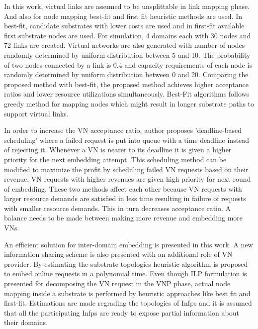 \documentclass[article,dr=phil,type=msc ,colorback,accentcolor=tud4b]{tudthesis}
\begin{document}
In this work, virtual links are assumed to be unsplittable in link mapping phase. And also for node mapping best-fit and first fit heuristic methods are used. In best-fit, candidate substrates with lower costs are used and in first-fit available first substrate nodes are used. For simulation, 4 domains each with 30 nodes and 72 links are created. Virtual networks are also generated with number of nodes randomly determined by uniform distribution between 5 and 10. The probability of two nodes connected by a link is 0.4 and capacity requirements of each node is  randomly determined by uniform distribution between 0 and 20.  Comparing the proposed method with best-fit, the proposed method achieves higher acceptance ratios and lower resource utilizations simultaneously. Best-Fit algorithms follows greedy method for mapping nodes which might result in longer substrate paths to support virtual links. 

In order to increase the VN acceptance ratio, author proposes 'deadline-based scheduling' where a failed request is put into queue with a time deadline instead of rejecting it. Whenever a VN is nearer to its deadline it is given a higher priority for the next embedding attempt. This scheduling method can be modified to maximize the profit by scheduling failed VN requests based on their revenue. VN requests with higher revenues are given high priority for next round of embedding. These two methods affect each other because VN requests with larger resource demands are satisfied in less time resulting in failure of requests with smaller resource demands. This in turn decreases acceptance ratio. A balance needs to be made between making more revenue and embedding more VNs. \newline

\hspace*{1cm} An efficient solution for inter-domain embedding is presented in this work. A new information sharing scheme is also presented with an additional role of VN provider. By estimating the substrate topologies heuristic algorithm is proposed to embed online requests in a polynomial time. Even though ILP formulation is presented for decomposing the VN request in the VNP phase, actual node mapping inside a substrate is performed by heuristic approaches like best fit and first-fit. Estimations are made regrading the topologies of Infps and it is assumed that all the participating Infps are ready to expose partial information about their domains.  
\end{document}

